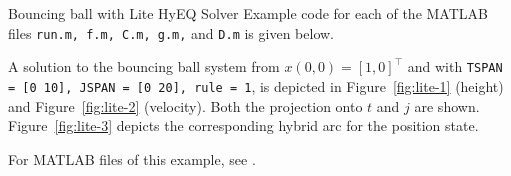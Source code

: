 \begin{example}{Bouncing ball with Lite HyEQ Solver}
Example code for each of the MATLAB files {\tt run.m, f.m, C.m, g.m,} 
and {\tt D.m} is given below.\\



A solution to the bouncing ball system from 
$x(0,0)=[1,0]^\top$ and with 
{\tt TSPAN = [0 10], JSPAN = [0 20], rule = 1}, 
is depicted in Figure~\ref{fig:lite-1} (height) 
and Figure~\ref{fig:lite-2} (velocity).  
Both the projection onto $t$ and $j$ are shown. 
Figure~\ref{fig:lite-3} depicts the corresponding hybrid arc for the position state.

For MATLAB files of this example, 
see .



\end{example}
